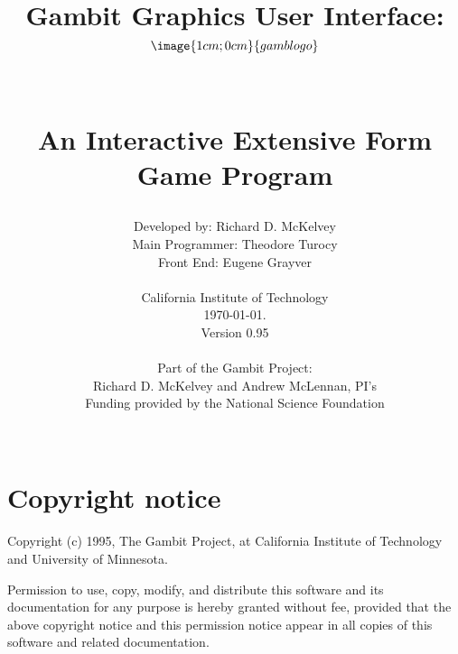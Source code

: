 %
%
%
%

\parskip=10pt%
\parindent=0pt%
\itemsep{0pt}
\title{Gambit Graphics User Interface:\\
$$\image{1cm;0cm}{gamblogo}$$\\
\centerline{An Interactive Extensive Form Game Program}}
\author{Developed by: Richard D. McKelvey\\
Main Programmer: Theodore Turocy\\
Front End: Eugene Grayver\\
 \\
California Institute of Technology\\ \today.\\
Version 0.95\\
 \\
Part of the Gambit Project:\\
Richard D. McKelvey and Andrew McLennan, PI's\\
Funding provided by the National Science Foundation\\
 \\}

\makeindex%
%
\maketitle%


\tableofcontents%

\chapter*{Copyright notice}%

Copyright (c) 1995, The Gambit Project, at California Institute of
Technology and University of Minnesota.  

Permission to use, copy, modify, and distribute this software and its
documentation for any purpose is hereby granted without fee, provided that the
above copyright notice and this permission notice appear in
all copies of this software and related documentation.

